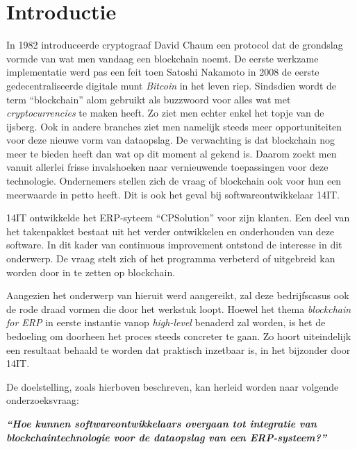 
\section{Introductie} %
\label{sec:introductie}

In 1982 introduceerde cryptograaf David Chaum een protocol dat de grondslag vormde van wat men vandaag een blockchain noemt. De eerste werkzame implementatie werd pas een feit toen Satoshi Nakamoto in 2008 de eerste gedecentraliseerde digitale munt \textit{Bitcoin} in het leven riep. Sindsdien wordt de term ``blockchain'' alom gebruikt als buzzwoord voor alles wat met \textit{cryptocurrencies} te maken heeft. Zo ziet men echter enkel het topje van de ijsberg. Ook in andere branches ziet men namelijk steeds meer opportuniteiten voor deze nieuwe vorm van dataopslag. De verwachting is dat blockchain nog meer te bieden heeft dan wat op dit moment al gekend is. Daarom zoekt men vanuit allerlei frisse invalshoeken naar vernieuwende toepassingen voor deze technologie. Ondernemers stellen zich de vraag of blockchain ook voor hun een meerwaarde in petto heeft. Dit is ook het geval bij softwareontwikkelaar 14IT.

14IT ontwikkelde het ERP-syteem ``CPSolution'' voor zijn klanten. Een deel van het takenpakket bestaat uit het verder ontwikkelen en onderhouden van deze software. In dit kader van continuous improvement ontstond de interesse in dit onderwerp. De vraag stelt zich of het programma verbeterd of uitgebreid kan worden door in te zetten op blockchain.

Aangezien het onderwerp van hieruit werd aangereikt, zal deze bedrijfscasus ook de rode draad vormen die door het werkstuk loopt. Hoewel het thema \textit{blockchain for ERP} in eerste instantie vanop \textit{high-level} benaderd zal worden, is het de bedoeling om doorheen het proces steeds concreter te gaan. Zo hoort uiteindelijk een resultaat behaald te worden dat praktisch inzetbaar is, in het bijzonder door 14IT.


De doelstelling, zoals hierboven beschreven, kan herleid worden naar volgende onderzoeksvraag:

\begin{center}
	\textit{\textbf{``Hoe kunnen softwareontwikkelaars overgaan tot integratie van blockchaintechnologie voor de dataopslag van een ERP-systeem?''}}
\end{center}

